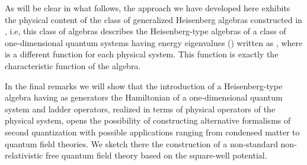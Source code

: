\documentclass[a4paper,12pt]{article}
\begin{document}
As will
be clear in what follows, the approach we have developed
here exhibits the physical content of the class of generalized
Heisenberg algebras constructed in \cite{algebra2}, i.e,
this class of algebras describes the Heisenberg-type
algebras of a class of one-dimensional quantum systems 
having energy eigenvalues (\coordHE{}) written as 
\coordHE{}, where 
\coordHE{} is a different function for each physical
system. This function \coordHE{} is exactly the 
characteristic function of the algebra.
 
In the final remarks we will show that 
the introduction of a Heisenberg-type algebra having
as generators the Hamiltonian of a one-dimensional
quantum system and ladder operators, 
realized in terms of physical operators of the physical 
system, opens the possibility of constructing alternative 
formalisms of second quantization with possible applications
ranging from condensed matter to quantum field theories. 
We sketch there the construction of a non-standard 
non-relativistic free quantum field theory based
on the square-well potential.
\end{document}
